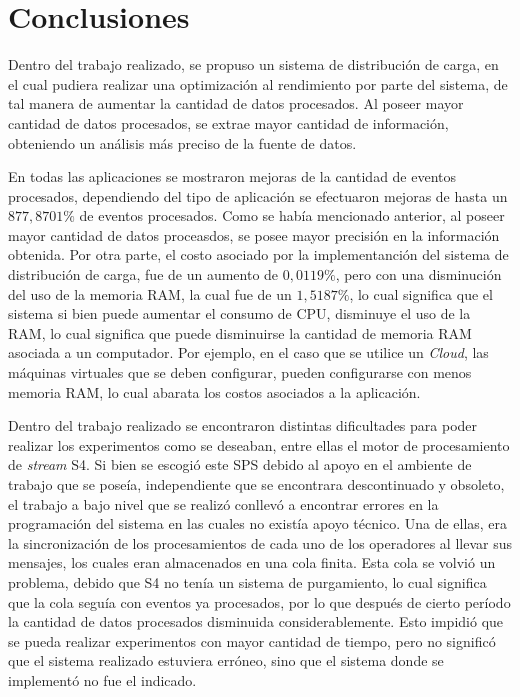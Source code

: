 \chapter{Conclusiones}
\label{cap:conclusiones}

Dentro del trabajo realizado, se propuso un sistema de distribución de carga, en el cual pudiera realizar una optimización al rendimiento por parte del sistema, de tal manera de aumentar la cantidad de datos procesados. Al poseer mayor cantidad de datos procesados, se extrae mayor cantidad de información, obteniendo un análisis más preciso de la fuente de datos.

En todas las aplicaciones se mostraron mejoras de la cantidad de eventos procesados, dependiendo del tipo de aplicación se efectuaron mejoras de hasta un $877,8701\%$ de eventos procesados. Como se había mencionado anterior, al poseer mayor cantidad de datos proceasdos, se posee mayor precisión en la información obtenida. Por otra parte, el costo asociado por la implementanción del sistema de distribución de carga, fue de un aumento de $0,0119\%$, pero con una disminución del uso de la memoria RAM, la cual fue de un $1,5187\%$, lo cual significa que el sistema si bien puede aumentar el consumo de CPU, disminuye el uso de la RAM, lo cual significa que puede disminuirse la cantidad de memoria RAM asociada a un computador. Por ejemplo, en el caso que se utilice un \textit{Cloud}, las máquinas virtuales que se deben configurar, pueden configurarse con menos memoria RAM, lo cual abarata los costos asociados a la aplicación.

Dentro del trabajo realizado se encontraron distintas dificultades para poder realizar los experimentos como se deseaban, entre ellas el motor de procesamiento de \textit{stream} S4. Si bien se escogió este SPS debido al apoyo en el ambiente de trabajo que se poseía, independiente que se encontrara descontinuado y obsoleto, el trabajo a bajo nivel que se realizó conllevó a encontrar errores en la programación del sistema en las cuales no existía apoyo técnico. Una de ellas, era la sincronización de los procesamientos de cada uno de los operadores al llevar sus mensajes, los cuales eran almacenados en una cola finita. Esta cola se volvió un problema, debido que S4 no tenía un sistema de purgamiento, lo cual significa que la cola seguía con eventos ya procesados, por lo que después de cierto período la cantidad de datos procesados disminuida considerablemente. Esto impidió que se pueda realizar experimentos con mayor cantidad de tiempo, pero no significó que el sistema realizado estuviera erróneo, sino que el sistema donde se implementó no fue el indicado.

